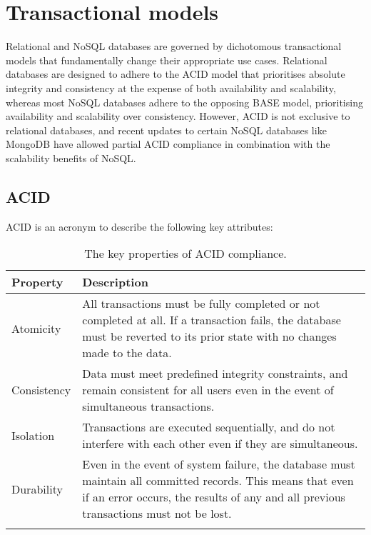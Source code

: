 \section{Transactional models}
Relational and NoSQL databases are governed by dichotomous transactional models that fundamentally change their appropriate use cases.
Relational databases are designed to adhere to the ACID model that prioritises absolute integrity and consistency at the expense of 
both availability and scalability, whereas most NoSQL databases adhere to the opposing BASE model, prioritising availability and scalability
over consistency. However, ACID is not exclusive to relational databases, and recent updates to certain NoSQL databases like MongoDB have 
allowed partial ACID compliance in combination with the scalability benefits of NoSQL.

\newpage

\subsection{ACID}\label{subsec:ACID}
ACID is an acronym to describe the following key attributes:


\begin{longtable}{ | p{} | p{} | }
    \hline
    \cellcolor{blue!25}Property & \cellcolor{blue!25}Description\\
    \hline
    Atomicity & All transactions must be fully completed or not completed at all. If a transaction fails,
    the database must be reverted to its prior state with no changes made to the data.  \\
    \hline
    Consistency & Data must meet predefined integrity constraints, and remain consistent for all users even in the event 
    of simultaneous transactions.  \\
    \hline 
    Isolation & Transactions are executed sequentially, and do not interfere with each other even if they are simultaneous. \\
    \hline 
    Durability & Even in the event of system failure, the database must maintain all committed records. This means that 
    even if an error occurs, the results of any and all previous transactions must not be lost. \\
    \hline
    \caption{The key properties of ACID compliance. \autocite{awsACIDVsBASE,neo4jDataConsistencyModels2023}}\label{tab:ACID}
\end{longtable}


